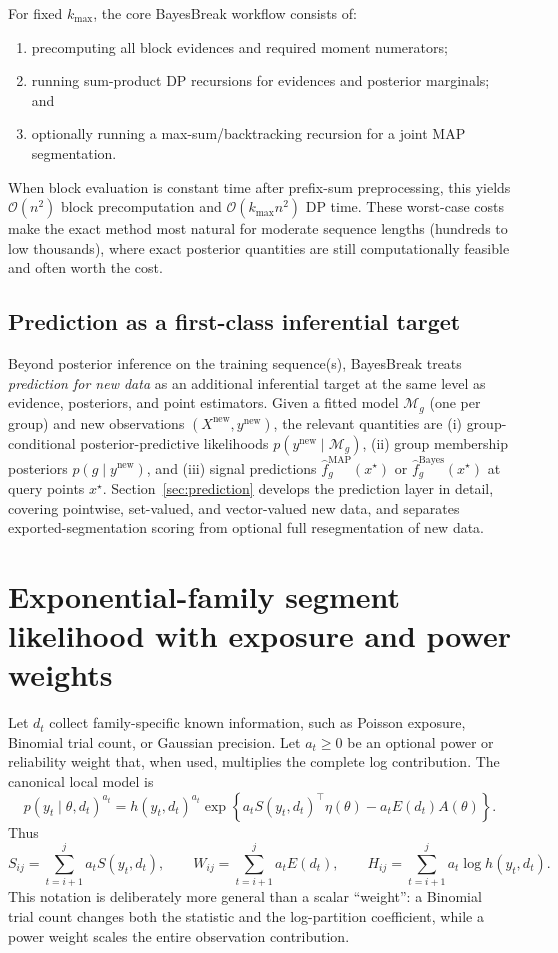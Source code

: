For fixed $k_{\max}$, the core BayesBreak workflow consists of:
\begin{enumerate}[label=(\alph*), leftmargin=2.3em]
\item precomputing all block evidences and required moment numerators;
\item running sum-product DP recursions for evidences and posterior marginals; and
\item optionally running a max-sum/backtracking recursion for a joint MAP segmentation.
\end{enumerate}
When block evaluation is constant time after prefix-sum preprocessing, this yields
$\mathcal{O}(n^2)$ block precomputation and $\mathcal{O}(k_{\max}n^2)$ DP time. These worst-case
costs make the exact method most natural for moderate sequence lengths (hundreds to low
thousands), where exact posterior quantities are still computationally feasible and often worth
the cost.

\subsection{Prediction as a first-class inferential target}
\label{sec:problem-prediction}

Beyond posterior inference on the training sequence(s), BayesBreak treats \emph{prediction for new
data} as an additional inferential target at the same level as evidence, posteriors, and point
estimators. Given a fitted model $\mathcal{M}_g$ (one per group) and new observations
$(X^{\mathrm{new}},y^{\mathrm{new}})$, the relevant quantities are (i) group-conditional
posterior-predictive likelihoods $p(y^{\mathrm{new}}\mid \mathcal{M}_g)$, (ii) group membership
posteriors $p(g\mid y^{\mathrm{new}})$, and (iii) signal predictions
$\widehat f^{\mathrm{MAP}}_g(x^\star)$ or $\widehat f^{\mathrm{Bayes}}_g(x^\star)$ at query
points $x^\star$. Section~\ref{sec:prediction} develops the prediction layer in detail, covering pointwise,
set-valued, and vector-valued new data, and separates exported-segmentation scoring from optional
full resegmentation of new data.

\section{Exponential-family segment likelihood with exposure and power weights}
\label{sec:setup}
Let $d_t$ collect family-specific known information, such as Poisson exposure, Binomial trial count,
or Gaussian precision. Let $a_t\ge 0$ be an optional power or reliability weight that, when used,
multiplies the complete log contribution. The canonical local model is
\begin{equation}
 p(y_t\mid\theta,d_t)^{a_t}
 =h(y_t,d_t)^{a_t}\exp\!\left\{a_t S(y_t,d_t)^\top\eta(\theta)-a_t E(d_t)A(\theta)\right\}.
\label{eq:EFbasic}
\end{equation}
Thus
\[
 S_{ij}=\sum_{t=i+1}^j a_tS(y_t,d_t),\qquad
 W_{ij}=\sum_{t=i+1}^j a_tE(d_t),\qquad
 H_{ij}=\sum_{t=i+1}^j a_t\log h(y_t,d_t).
\]
This notation is deliberately more general than a scalar ``weight'': a Binomial trial count changes
both the statistic and the log-partition coefficient, while a power weight scales the entire
observation contribution.

